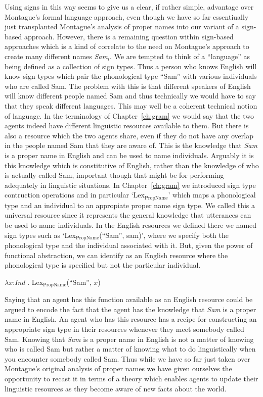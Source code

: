 Using signs in this way seems to give us a clear, if rather simple,
advantage over Montague's formal language approach, even though we
have so far essentiually just transplanted Montague's analysis of
proper names into our variant of a sign-based approach.  However,
there is a remaining question within sign-based approaches which is
a kind of correlate to the need on Montague's approach to create many
different names \textit{Sam}$_i$.  We are tempted to think of a
``language'' as being defined as a collection of sign types.  Thus a
person who knows English will know sign types which pair the
phonological type ``Sam'' with various individuals who are called
Sam.  The problem with this is that different speakers of English will
know different people named Sam and thus technically we would have to
say that they speak different languages.  This may well be a coherent
technical notion of language.  In the terminology of
Chapter~\ref{ch:gram} we would say that the two agents indeed have
different linguistic resources available to them.  But there is also a
resource which the two agents share, even if they do not have any
overlap in the people named Sam that they are aware of.  This is the
knowledge that \textit{Sam} is a proper name in English and can be
used to name individuals.  Arguably it is this knowledge which is
constitutive of English, rather than the knowledge of who is actually
called Sam, important though that might be for performing adequately
in linguistic situations.  In Chapter~\ref{ch:gram} we introduced sign
type contruction operations and in particular
`Lex$_{\mathrm{PropName}}$' which maps a phonological type and an
individual to an appropiate proper name sign type.  We called this a universal resource
since it represents the general knowledge that utterances can be used
to name individuals.  In the English resources we defined there we
named sign types such as `Lex$_{\mathrm{PropName}}$(``Sam'', sam)',
where we specify both the phonological type and the individual
associated with it.  But, given the power of functional abstraction,
we can identify \nexteg{} as an English resource where the
phonological type is specified but not the particular individual.
\begin{ex} 
$\lambda x$:\textit{Ind} . Lex$_{\mathrm{PropName}}$(``Sam'', $x$)
\label{ex:lexpropnameSamResource} 
\end{ex} 
Saying that an agent has this function available as an English resource could
be argued to encode the fact that the agent has the knowledge that
\textit{Sam} is a proper name in English.  An agent who has this
resource has a recipe for constructing an appropriate sign type in
their resources whenever they meet somebody called Sam.  Knowing that
\textit{Sam} is a proper name in English is not a matter of knowing
who is called Sam but rather a matter of knowing what to do
linguistically when you encounter somebody called Sam.  Thus while we
have so far just taken over Montague's original analysis of proper
names we have given ourselves the opportunity to recast it in terms of
a theory which enables agents to update their linguistic resources as
they become aware of new facts about the world.

